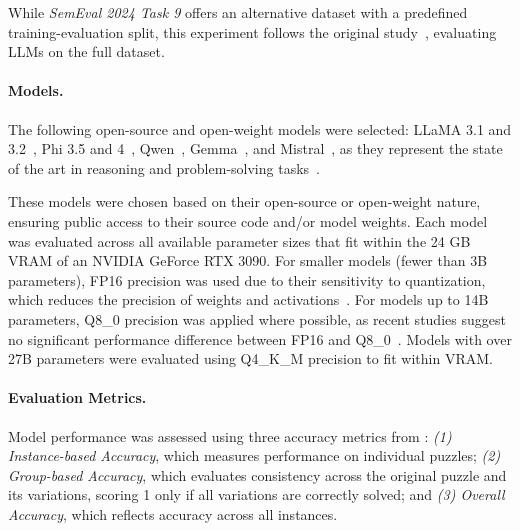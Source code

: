 While \textit{SemEval 2024 Task 9} offers an alternative dataset with a predefined training-evaluation split, this experiment follows the original study~\cite{jiangBRAINTEASERLateralThinking2023}, evaluating \acp{LLM} on the full dataset.

\paragraph{Models.}
The following open-source and open-weight models were selected: \ac{LLaMA} 3.1 and 3.2~\cite{grattafioriLlama3Herd2024}, \acs{Phi} 3.5 and 4~\cite{abdinPhi3TechnicalReport2024, abdinPhi4TechnicalReport2024}, \acs{Qwen}~\cite{qwenQwen25TechnicalReport2025}, \acs{Gemma}~\cite{teamGemma2Improving2024}, and \acs{Mistral}~\cite{MistralNeMoMistral}, as they represent the state of the art in reasoning and problem-solving tasks~\cite{grattafioriLlama3Herd2024, abdinPhi3TechnicalReport2024, abdinPhi4TechnicalReport2024, qwenQwen25TechnicalReport2025, teamGemma2Improving2024, MistralNeMoMistral}.

These models were chosen based on their open-source or open-weight nature, ensuring public access to their source code and/or model weights. Each model was evaluated across all available parameter sizes that fit within the 24 GB \ac{VRAM} of an NVIDIA GeForce RTX 3090. For smaller models (fewer than 3B parameters), FP16 precision was used due to their sensitivity to quantization, which reduces the precision of weights and activations~\cite{liEvaluatingQuantizedLarge2024}. For models up to 14B parameters, Q8\_0 precision was applied where possible, as recent studies suggest no significant performance difference between FP16 and Q8\_0~\cite{raubaQuantifyingPerturbationImpacts2024, liEvaluatingQuantizedLarge2024}. Models with over 27B parameters were evaluated using Q4\_K\_M precision to fit within \ac{VRAM}.

\paragraph{Evaluation Metrics.}
\label{evaluation-metrics}
Model performance was assessed using three accuracy metrics from \textcite{jiangBRAINTEASERLateralThinking2023}: \textit{(1) Instance-based Accuracy}, which measures performance on individual puzzles; \textit{(2) Group-based Accuracy}, which evaluates consistency across the original puzzle and its variations, scoring 1 only if all variations are correctly solved; and \textit{(3) Overall Accuracy}, which reflects accuracy across all instances.

